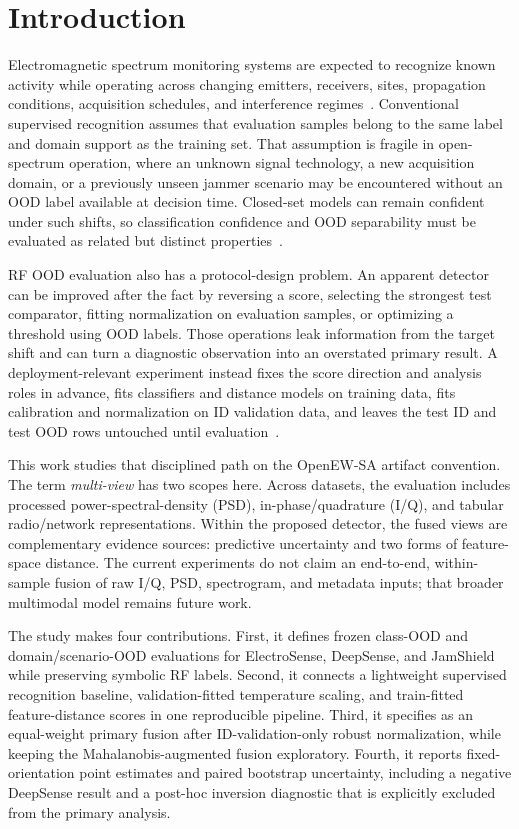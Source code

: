 \section{Introduction}
\label{sec:introduction}

Electromagnetic spectrum monitoring systems are expected to recognize known activity while operating across changing emitters, receivers, sites, propagation conditions, acquisition schedules, and interference regimes~\cite{itu2011spectrum,rajendran2018electrosense}. Conventional supervised recognition assumes that evaluation samples belong to the same label and domain support as the training set. That assumption is fragile in open-spectrum operation, where an unknown signal technology, a new acquisition domain, or a previously unseen jammer scenario may be encountered without an OOD label available at decision time. Closed-set models can remain confident under such shifts, so classification confidence and OOD separability must be evaluated as related but distinct properties~\cite{ovadia2019trust,nguyen2015fooled}.

RF OOD evaluation also has a protocol-design problem. An apparent detector can be improved after the fact by reversing a score, selecting the strongest test comparator, fitting normalization on evaluation samples, or optimizing a threshold using OOD labels. Those operations leak information from the target shift and can turn a diagnostic observation into an overstated primary result. A deployment-relevant experiment instead fixes the score direction and analysis roles in advance, fits classifiers and distance models on training data, fits calibration and normalization on ID validation data, and leaves the test ID and test OOD rows untouched until evaluation~\cite{shafaei2019biased,yang2022openood}.

This work studies that disciplined path on the OpenEW-SA artifact convention. The term \emph{multi-view} has two scopes here. Across datasets, the evaluation includes processed power-spectral-density (PSD), in-phase/quadrature (I/Q), and tabular radio/network representations. Within the proposed detector, the fused views are complementary evidence sources: predictive uncertainty and two forms of feature-space distance. The current experiments do not claim an end-to-end, within-sample fusion of raw I/Q, PSD, spectrogram, and metadata inputs; that broader multimodal model remains future work.

The study makes four contributions. First, it defines frozen class-OOD and domain/scenario-OOD evaluations for ElectroSense, DeepSense, and JamShield while preserving symbolic RF labels. Second, it connects a lightweight supervised recognition baseline, validation-fitted temperature scaling, and train-fitted feature-distance scores in one reproducible pipeline. Third, it specifies \primarymethod{} as an equal-weight primary fusion after ID-validation-only robust normalization, while keeping the Mahalanobis-augmented fusion exploratory. Fourth, it reports fixed-orientation point estimates and paired bootstrap uncertainty, including a negative DeepSense result and a post-hoc inversion diagnostic that is explicitly excluded from the primary analysis.

